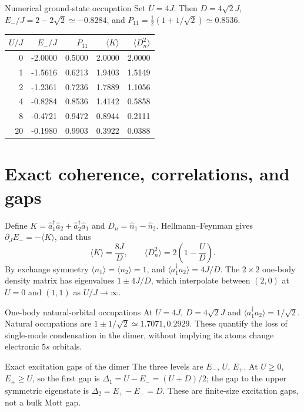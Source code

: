 \documentclass[11pt,a4paper]{article}
\begin{document}
\begin{worked}{Numerical ground-state occupation}
Set $U=4J$. Then $D=4\sqrt2J$, $E_-/J=2-2\sqrt2\simeq-0.8284$, and $P_{11}=\tfrac12(1+1/\sqrt2)\simeq0.8536$.
\end{worked}
\begin{center}\begin{tabular}{rrrrr}\toprule
$U/J$ & $E_-/J$ & $P_{11}$ & $\langle K\rangle$ & $\langle D_n^2\rangle$\\\midrule
0&-2.0000&0.5000&2.0000&2.0000\\
1&-1.5616&0.6213&1.9403&1.5149\\
2&-1.2361&0.7236&1.7889&1.1056\\
4&-0.8284&0.8536&1.4142&0.5858\\
8&-0.4721&0.9472&0.8944&0.2111\\
20&-0.1980&0.9903&0.3922&0.0388\\\bottomrule
\end{tabular}\end{center}
\section{Exact coherence, correlations, and gaps}
Define $K=\hat a_1^\dagger\hat a_2+\hat a_2^\dagger\hat a_1$ and $D_n=\hat n_1-\hat n_2$. Hellmann--Feynman gives $\partial_JE_-=-\langle K\rangle$, and thus
\begin{equation}\boxed{\langle K\rangle=\frac{8J}{D},\qquad \langle D_n^2\rangle=2\left(1-\frac UD\right).}\end{equation}
By exchange symmetry $\langle n_1\rangle=\langle n_2\rangle=1$, and $\langle a_1^\dagger a_2\rangle=4J/D$. The $2\times2$ one-body density matrix has eigenvalues $1\pm4J/D$, which interpolate between $(2,0)$ at $U=0$ and $(1,1)$ as $U/J\to\infty$.
\begin{worked}{One-body natural-orbital occupations}
At $U=4J$, $D=4\sqrt2J$ and $\langle a_1^\dagger a_2\rangle=1/\sqrt2$. Natural occupations are $1\pm1/\sqrt2\simeq1.7071,0.2929$. These quantify the loss of single-mode condensation in the dimer, without implying its atoms change electronic $5s$ orbitals.
\end{worked}
\begin{worked}{Exact excitation gaps of the dimer}
The three levels are $E_-$, $U$, $E_+$. At $U\ge0$, $E_+\ge U$, so the first gap is $\Delta_1=U-E_-=(U+D)/2$; the gap to the upper symmetric eigenstate is $\Delta_2=E_+-E_-=D$. These are finite-size excitation gaps, not a bulk Mott gap.
\end{worked}
\begin{center}\end{center}
\end{document}
